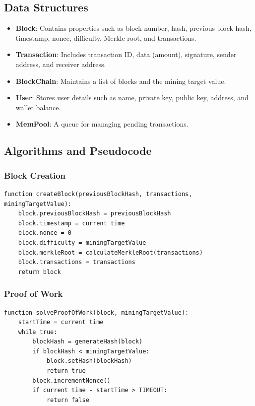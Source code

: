 \documentclass[12pt]{article}
\begin{document}
\subsection{Data Structures}
\begin{itemize}
    \item \textbf{Block}: Contains properties such as block number, hash, previous block hash, timestamp, nonce, difficulty, Merkle root, and transactions.
    \item \textbf{Transaction}: Includes transaction ID, data (amount), signature, sender address, and receiver address.
    \item \textbf{BlockChain}: Maintains a list of blocks and the mining target value.
    \item \textbf{User}: Stores user details such as name, private key, public key, address, and wallet balance.
    \item \textbf{MemPool}: A queue for managing pending transactions.
\end{itemize}

\subsection{Algorithms and Pseudocode}
\subsubsection{Block Creation}
\begin{verbatim}
function createBlock(previousBlockHash, transactions, miningTargetValue):
    block.previousBlockHash = previousBlockHash
    block.timestamp = current time
    block.nonce = 0
    block.difficulty = miningTargetValue
    block.merkleRoot = calculateMerkleRoot(transactions)
    block.transactions = transactions
    return block
\end{verbatim}

\subsubsection{Proof of Work}
\begin{verbatim}
function solveProofOfWork(block, miningTargetValue):
    startTime = current time
    while true:
        blockHash = generateHash(block)
        if blockHash < miningTargetValue:
            block.setHash(blockHash)
            return true
        block.incrementNonce()
        if current time - startTime > TIMEOUT:
            return false
\end{verbatim}
\end{document}

